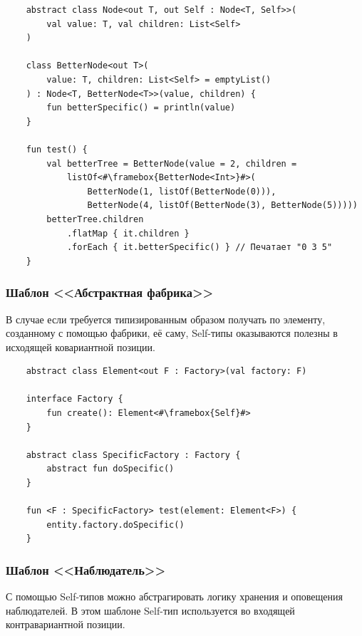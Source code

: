 \begin{verbatim}
    abstract class Node<out T, out Self : Node<T, Self>>(
        val value: T, val children: List<Self>
    )

    class BetterNode<out T>(
        value: T, children: List<Self> = emptyList()
    ) : Node<T, BetterNode<T>>(value, children) {
        fun betterSpecific() = println(value)
    }

    fun test() {
        val betterTree = BetterNode(value = 2, children =
            listOf<#\framebox{BetterNode<Int>}#>(
                BetterNode(1, listOf(BetterNode(0))),
                BetterNode(4, listOf(BetterNode(3), BetterNode(5)))))
        betterTree.children
            .flatMap { it.children }
            .forEach { it.betterSpecific() } // Печатает "0 3 5"
    }
\end{verbatim}

\subsubsection{Шаблон <<Абстрактная фабрика>>}

В случае если требуется типизированным образом получать по элементу, созданному с помощью фабрики, её саму, Self-типы оказываются полезны в исходящей ковариантной позиции.

\begin{verbatim}
    abstract class Element<out F : Factory>(val factory: F)

    interface Factory {
        fun create(): Element<#\framebox{Self}#>
    }

    abstract class SpecificFactory : Factory {
        abstract fun doSpecific()
    }

    fun <F : SpecificFactory> test(element: Element<F>) {
        entity.factory.doSpecific()
    }
\end{verbatim}

\subsubsection{Шаблон <<Наблюдатель>>}

С помощью Self-типов можно абстрагировать логику хранения и оповещения наблюдателей.
В этом шаблоне Self-тип используется во входящей контравариантной позиции.

